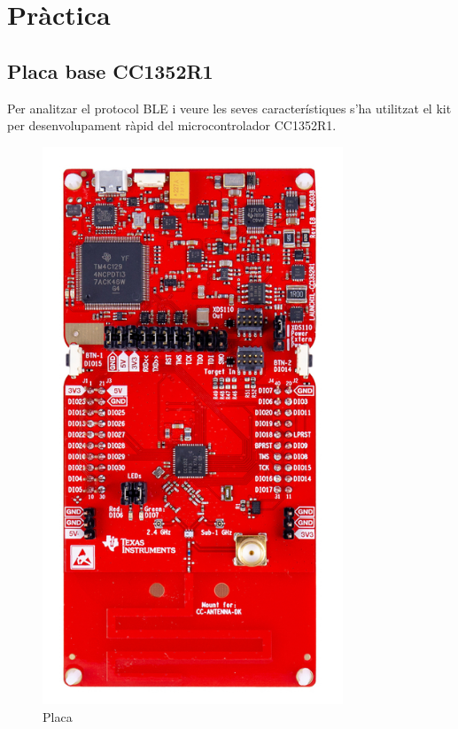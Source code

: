 \chapter{Pràctica}
\section{Placa base CC1352R1}
Per analitzar el protocol BLE i veure les seves característiques s'ha utilitzat el kit per desenvolupament ràpid del microcontrolador CC1352R1.
\begin{figure}[h]
	\begin{center}
		\includegraphics[width=0.8\textwidth]{./images/launchxl-cc1352r1.jpg}
		\caption{Placa \cite{placa}}
	\end{center}
\end{figure}

